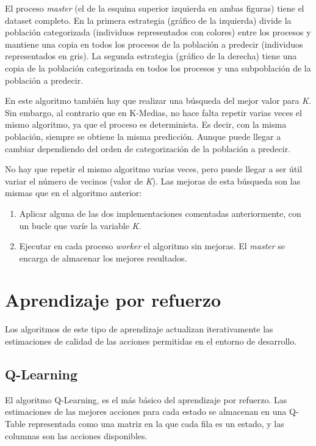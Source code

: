 		El proceso \textit{master} (el de la esquina superior izquierda en ambas figuras) tiene el dataset completo. En la primera estrategia (gráfico de la izquierda) divide la población categorizada (individuos representados con colores) entre los procesos y mantiene una copia en todos los procesos de la población a predecir (individuos representados en gris). La segunda estrategia (gráfico de la derecha) tiene una copia de la población categorizada en todos los procesos y una subpoblación de la población a predecir.
		
		
		En este algoritmo también hay que realizar una búsqueda del mejor valor para \textit{K}. Sin embargo, al contrario que en K-Medias, no hace falta repetir varias veces el mismo algoritmo, ya que el proceso es determinista. Es decir, con la misma población, siempre se obtiene la misma predicción. Aunque puede llegar a cambiar dependiendo del orden de categorización de la población a predecir. 
		
		No hay que repetir el mismo algoritmo varias veces, pero puede llegar a ser útil variar el número de vecinos (valor de \textit{K}). Las mejoras de esta búsqueda son las mismas que en el algoritmo anterior: 
		
		\begin{enumerate}
			\item Aplicar alguna de las dos implementaciones comentadas anteriormente, con un bucle que varíe la variable \textit{K}. 
			\item Ejecutar en cada proceso \textit{worker} el algoritmo sin mejoras. El \textit{master} se encarga de almacenar los mejores resultados.
		\end{enumerate}
		
		


\section{Aprendizaje por refuerzo}
	\label{cap:3_3}
	Los algoritmos de este tipo de aprendizaje actualizan iterativamente las estimaciones de calidad de las acciones permitidas en el entorno de desarrollo. 
	
	\subsection{Q-Learning}
	\label{cap:3_3_1}
		El algoritmo Q-Learning, es el más básico del aprendizaje por refuerzo. Las estimaciones de las mejores acciones para cada estado se almacenan en una Q-Table representada como una matriz en la que cada fila es un estado, y las columnas son las acciones disponibles. 
		

